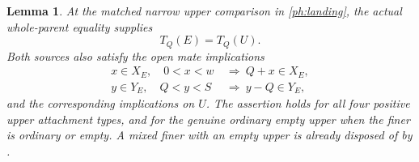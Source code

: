 \documentclass[11pt,a4paper]{amsart}
\numberwithin{equation}{section}
\theoremstyle{plain}
\newtheorem{lemma}[theorem]{Lemma}
\theoremstyle{definition}
\begin{document}
\begin{lemma}\label{ph:activation}
At the matched narrow upper comparison in \eqref{ph:landing}, the actual
whole-parent equality supplies
\begin{equation}\label{ph:current}
 T_Q(E)=T_Q(U).
\end{equation}
Both sources also satisfy the open mate implications
\begin{equation}\label{ph:UM}
 \begin{aligned}
 x\in X_E,\quad0<x<w&\ \Longrightarrow\ Q+x\in X_E,\\
 y\in Y_E,\quad Q<y<S&\ \Longrightarrow\ y-Q\in Y_E,
 \end{aligned}
\end{equation}
and the corresponding implications on \(U\).  The assertion holds for
all four positive upper attachment types, and for the genuine ordinary
empty upper when the finer is ordinary or empty.  A mixed finer with
an empty upper is already disposed of by .
\end{lemma}
\end{document}
